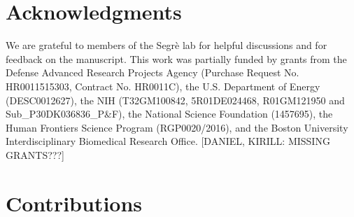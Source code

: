 
\section*{Acknowledgments}

We are grateful to members of the Segrè lab for helpful discussions and for feedback on the manuscript. This work was partially funded by grants from the Defense Advanced Research Projects Agency (Purchase Request No. HR0011515303, Contract No. HR0011\-C), the U.S. Department of Energy (DE\-SC0012627), the NIH (T32GM100842, 5R01DE024468, R01GM121950 and Sub\_P30DK036836\_P\&F), the National Science Foundation (1457695), the Human Frontiers Science Program (RGP0020/2016), and the Boston University Interdisciplinary Biomedical Research Office. [DANIEL, KIRILL: MISSING GRANTS???] 

\section*{Contributions}
